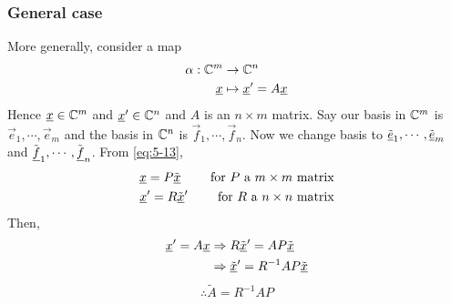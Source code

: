\documentclass{article}
\numberwithin{equation}{section}
\begin{document}
\subsubsection*{General case}
More generally, consider a map
\begin{align*}
    \alpha : \mathbb{C}^m &\rightarrow \mathbb{C}^n \\
    \underline{x} &\mapsto \underline{x}' = A\underline{x}
\end{align*}
Hence $\underline{x} \in \mathbb{C}^m$ and $\underline{x}' \in \mathbb{C}^n$ and $A$ is an $n \times m$ matrix.
Say our basis in $\mathbb{C}^m$ is $\vec e_1, \cdots, \vec e_m$ and the basis in $\mathbb{C}^n$ is $\vec f_1, \cdots, \vec f_n$.
Now we change basis to  $\tilde{\underline{e}}_1, \cdots, \tilde{\underline{e}}_m$ and $\tilde{\underline{f}}_1, \cdots, \tilde{\underline{f}}_n$.
From \eqref{eq:5-13},
\begin{align*}
    \underline{x} = P \tilde{\underline{x}} \qquad \text{ for } P \text{ a } m \times m \text{ matrix} \\
    \underline{x}' = R \tilde{\underline{x}}' \qquad \text{ for } R \text{ a } n \times n \text{ matrix}
\end{align*}
Then,
\begin{align*}
    \underline{x}' = A \underline{x} &\Rightarrow R \tilde{\underline{x}}' = AP \tilde{\underline{x}} \\
    &\Rightarrow \tilde{\underline{x}}' = R^{-1}AP \tilde{\underline{x}}
\end{align*}
\begin{equation}\label{eq:5-15}
    \therefore \tilde{A} = R^{-1}AP
\end{equation}
\end{document}
